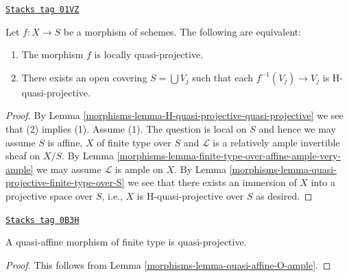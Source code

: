 \begin{lemma}
\label{morphisms-lemma-characterize-locally-quasi-projective}
\href{https://stacks.math.columbia.edu/tag/01VZ}{\texttt{Stacks tag 01VZ}}

Let $f : X \to S$ be a morphism of schemes.
The following are equivalent:
\begin{enumerate}
\item The morphism $f$ is locally quasi-projective.
\item There exists an open covering $S = \bigcup V_j$ such
that each $f^{-1}(V_j) \to V_j$ is H-quasi-projective.
\end{enumerate}
\end{lemma}

\begin{proof}

By Lemma \ref{morphisms-lemma-H-quasi-projective-quasi-projective}
we see that (2) implies (1). Assume (1).
The question is local on $S$ and hence we may assume $S$ is affine,
$X$ of finite type over $S$ and
$\mathcal{L}$ is a relatively ample invertible sheaf on $X/S$.
By Lemma \ref{morphisms-lemma-finite-type-over-affine-ample-very-ample}
we may assume $\mathcal{L}$ is ample on $X$.
By Lemma \ref{morphisms-lemma-quasi-projective-finite-type-over-S} we see that there
exists an immersion of $X$ into
a projective space over $S$, i.e., $X$ is H-quasi-projective over $S$
as desired.
\end{proof}

\begin{lemma}
\label{morphisms-lemma-quasi-affine-finite-type-quasi-projective}
\href{https://stacks.math.columbia.edu/tag/0B3H}{\texttt{Stacks tag 0B3H}}

\begin{reference}
\cite[II, Proposition 5.3.4 (i)]{EGA}
\end{reference}
A quasi-affine morphism of finite type is quasi-projective.
\end{lemma}

\begin{proof}

This follows from Lemma \ref{morphisms-lemma-quasi-affine-O-ample}.
\end{proof}

